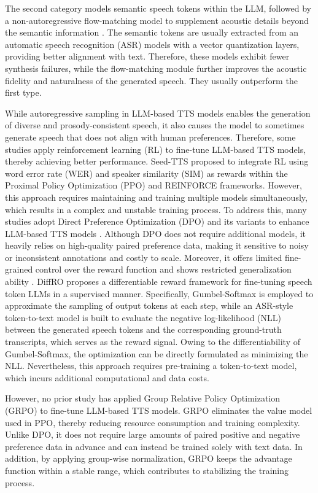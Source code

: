 \documentclass{article}
\begin{document}
The second category models semantic speech tokens within the LLM, followed by a non-autoregressive flow-matching model to supplement acoustic details beyond the semantic information \cite{seedtts,cosyvoice}. 
The semantic tokens are usually extracted from an automatic speech recognition (ASR) models with a vector quantization layers, providing better alignment with text. 
Therefore, these models exhibit fewer synthesis failures, while the flow-matching module further improves the acoustic fidelity and naturalness of the generated speech. They usually outperform the first type.

While autoregressive sampling in LLM-based TTS models enables the generation of diverse and prosody-consistent speech, it also causes the model to sometimes generate speech that does not align with human preferences.
Therefore, some studies apply reinforcement learning (RL) to fine-tune LLM-based TTS models, thereby achieving better performance.
Seed-TTS \cite{seedtts} proposed to integrate RL using word error rate (WER) and speaker similarity (SIM) as rewards within the Proximal Policy Optimization (PPO) \cite{ppo} and REINFORCE \cite{REINFORCE} frameworks.
However, this approach requires maintaining and training multiple models simultaneously, which results in a complex and unstable training process.
To address this, many studies adopt Direct Preference Optimization (DPO) \cite{dpo} and its variants to enhance LLM-based TTS models \cite{emodpo,dpollmtts,koeltts}.
Although DPO does not require additional models, it heavily relies on high-quality paired preference data, making it sensitive to noisy or inconsistent annotations and costly to scale. Moreover, it offers limited fine-grained control over the reward function and shows restricted generalization ability \cite{limitdpo,isdposuper,DPOvsGRPO}.
DiffRO \cite{cosyvoice3,diffro} proposes a differentiable reward framework for fine-tuning speech token LLMs in a supervised manner. Specifically, Gumbel-Softmax is employed to approximate the sampling of output tokens at each step, while an ASR-style token-to-text model is built to evaluate the negative log-likelihood (NLL) between the generated speech tokens and the corresponding ground-truth transcripts, which serves as the reward signal. Owing to the differentiability of Gumbel-Softmax, the optimization can be directly formulated as minimizing the NLL. Nevertheless, this approach requires pre-training a token-to-text model, which incurs additional computational and data costs.

However, no prior study has applied Group Relative Policy Optimization (GRPO) \cite{deepseekmath} to fine-tune LLM-based TTS models. GRPO eliminates the value model used in PPO, thereby reducing resource consumption and training complexity. Unlike DPO, it does not require large amounts of paired positive and negative preference data in advance and can instead be trained solely with text data. In addition, by applying group-wise normalization, GRPO keeps the advantage function within a stable range, which contributes to stabilizing the training process.
\end{document}
